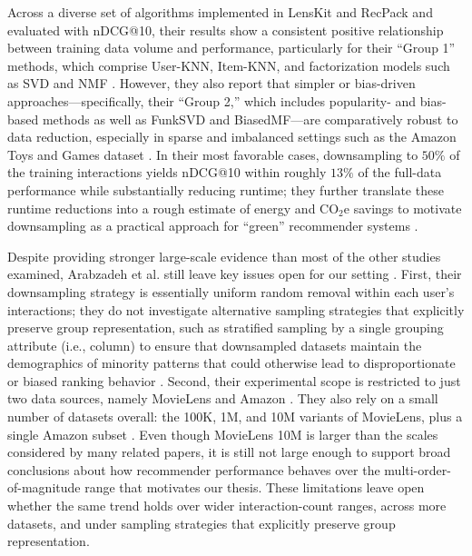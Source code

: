 \documentclass[12pt,a4paper]{article}
\begin{document}
Across a diverse set of algorithms implemented in LensKit and RecPack and evaluated with nDCG@10, their results show a consistent positive relationship between training data volume and performance, particularly for their ``Group 1'' methods, which comprise User-KNN, Item-KNN, and factorization models such as SVD and NMF \cite{arabzadeh2025}. However, they also report that simpler or bias-driven approaches---specifically, their ``Group 2,'' which includes popularity- and bias-based methods as well as FunkSVD and BiasedMF---are comparatively robust to data reduction, especially in sparse and imbalanced settings such as the Amazon Toys and Games dataset \cite{arabzadeh2025}. In their most favorable cases, downsampling to $50\%$ of the training interactions yields nDCG@10 within roughly $13\%$ of the full-data performance while substantially reducing runtime; they further translate these runtime reductions into a rough estimate of energy and CO$_2$e savings to motivate downsampling as a practical approach for ``green'' recommender systems \cite{arabzadeh2025}.

Despite providing stronger large-scale evidence than most of the other studies examined, Arabzadeh et al. still leave key issues open for our setting \cite{arabzadeh2025}. First, their downsampling strategy is essentially uniform random removal within each user’s interactions; they do not investigate alternative sampling strategies that explicitly preserve group representation, such as stratified sampling by a single grouping attribute (i.e., column) to ensure that downsampled datasets maintain the demographics of minority patterns that could otherwise lead to disproportionate or biased ranking behavior \cite{arabzadeh2025}. Second, their experimental scope is restricted to just two data sources, namely MovieLens and Amazon \cite{arabzadeh2025}. They also rely on a small number of datasets overall: the 100K, 1M, and 10M variants of MovieLens, plus a single Amazon subset \cite{arabzadeh2025}. Even though MovieLens 10M is larger than the scales considered by many related papers, it is still not large enough to support broad conclusions about how recommender performance behaves over the multi-order-of-magnitude range that motivates our thesis. These limitations leave open whether the same trend holds over wider interaction-count ranges, across more datasets, and under sampling strategies that explicitly preserve group representation.
\end{document}
